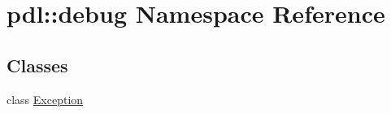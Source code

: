 \hypertarget{namespacepdl_1_1debug}{}\section{pdl\+::debug Namespace Reference}
\label{namespacepdl_1_1debug}
\subsection*{Classes}
\begin{DoxyCompactItemize}
\item 
class \mbox{\hyperlink{classpdl_1_1debug_1_1_exception}{Exception}}
\end{DoxyCompactItemize}
